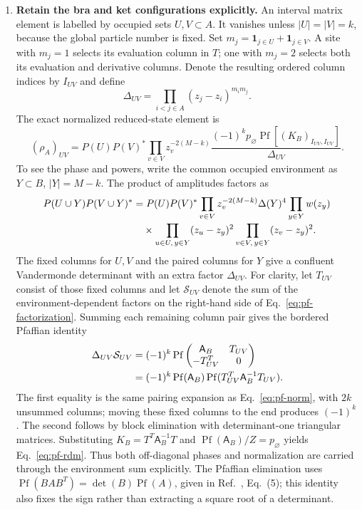 \begin{enumerate}
\item \textbf{Retain the bra and ket configurations explicitly.}
An interval matrix element is labelled by occupied sets $U,V\subset A$.
It vanishes unless $|U|=|V|=k$, because the global particle number is fixed.
Set $m_j=\mathbf1_{j\in U}+\mathbf1_{j\in V}$. A site with $m_j=1$
selects its evaluation column in $T$; one with $m_j=2$ selects both its
evaluation and derivative columns. Denote the resulting ordered column
indices by $I_{UV}$ and define
\begin{equation}
 \Delta_{UV}=\prod_{i<j\in A}(z_j-z_i)^{m_i m_j}.
\end{equation}
The exact normalized reduced-state element is
\begin{equation}
 (\rho_A)_{UV}=
 P(U)P(V)^*\!\prod_{v\in V}z_v^{-2(M-k)}
 \frac{(-1)^k p_\varnothing
 \operatorname{Pf}[(K_B)_{I_{UV},I_{UV}}]}{\Delta_{UV}}.
 \label{eq:pf-rdm}
\end{equation}
To see the phase and powers, write the common occupied environment as
$Y\subset B$, $|Y|=M-k$. The product of amplitudes factors as
\begin{align}
 P(U\cup Y)P(V\cup Y)^*
 &=P(U)P(V)^*\prod_{v\in V}z_v^{-2(M-k)}
 \Delta(Y)^4\prod_{y\in Y}w(z_y)\notag\\[-2pt]
 &\quad\times\prod_{u\in U,\,y\in Y}(z_u-z_y)^2
 \prod_{v\in V,\,y\in Y}(z_v-z_y)^2.
 \label{eq:pf-factorization}
\end{align}
The fixed columns for $U,V$ and the paired columns for $Y$ give a
confluent Vandermonde determinant with an extra factor $\Delta_{UV}$.
For clarity, let $T_{UV}$ consist of those fixed columns and let
$\mathcal S_{UV}$ denote the sum of the environment-dependent factors
on the right-hand side of Eq.~\eqref{eq:pf-factorization}. Summing each remaining
column pair gives the bordered Pfaffian identity
\begin{align}
 \Delta_{UV}\mathcal S_{UV}
 &=(-1)^k\operatorname{Pf}
 \begin{pmatrix}\mathsf A_B&T_{UV}\\-T_{UV}^T&0\end{pmatrix}\notag\\
 &=(-1)^k\operatorname{Pf}(\mathsf A_B)
       \operatorname{Pf}(T_{UV}^T\mathsf A_B^{-1}T_{UV}).
 \label{eq:pf-bordered}
\end{align}
The first equality is the same pairing expansion as
Eq.~\eqref{eq:pf-norm}, with $2k$ unsummed columns; moving these fixed
columns to the end produces $(-1)^k$. The second follows by block
elimination with determinant-one triangular matrices. Substituting
$K_B=T^T\mathsf A_B^{-1}T$ and
$\operatorname{Pf}(\mathsf A_B)/Z=p_\varnothing$ yields
Eq.~\eqref{eq:pf-rdm}. Thus both off-diagonal phases and normalization
are carried through the environment sum explicitly.
The Pfaffian elimination uses
$\operatorname{Pf}(BAB^T)=\det(B)\operatorname{Pf}(A)$, given in
Ref.~\cite{Wimmer}, Eq.~(5); this identity also fixes the sign rather
than extracting a square root of a determinant.


\end{enumerate}
